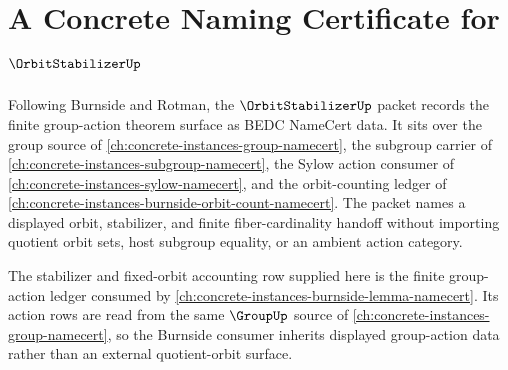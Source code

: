 \chapter{A Concrete Naming Certificate for $\OrbitStabilizerUp$}
\label{ch:concrete-instances-orbit-stabilizer-namecert}

Following Burnside and Rotman, the $\OrbitStabilizerUp$ packet records the finite group-action theorem surface as BEDC NameCert data. It sits over the group source of \autoref{ch:concrete-instances-group-namecert}, the subgroup carrier of \autoref{ch:concrete-instances-subgroup-namecert}, the Sylow action consumer of \autoref{ch:concrete-instances-sylow-namecert}, and the orbit-counting ledger of \autoref{ch:concrete-instances-burnside-orbit-count-namecert}. The packet names a displayed orbit, stabilizer, and finite fiber-cardinality handoff without importing quotient orbit sets, host subgroup equality, or an ambient action category.

The stabilizer and fixed-orbit accounting row supplied here is the finite group-action ledger consumed by \autoref{ch:concrete-instances-burnside-lemma-namecert}. Its action rows are read from the same $\GroupUp$ source of \autoref{ch:concrete-instances-group-namecert}, so the Burnside consumer inherits displayed group-action data rather than an external quotient-orbit surface.

